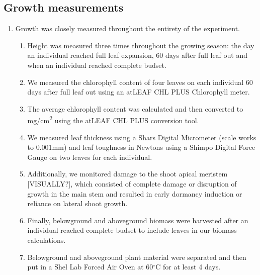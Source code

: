 \documentclass{article}\usepackage[]{graphicx}\usepackage[]{color}
\begin{document}
\subsection*{Growth measurements}
\begin{enumerate}
\item Growth was closely measured throughout the entirety of the experiment. 
  \begin{enumerate}
  \item Height was measured three times throughout the growing season: the day an individual reached full leaf expansion, 60 days after full leaf out and when an individual reached complete budset. 
  \item We measured the chlorophyll content of four leaves on each individual 60 days after full leaf out using an atLEAF CHL PLUS Chlorophyll meter.
  \item The average chlorophyll content was calculated and then converted to mg/cm\textsuperscript{2} using the atLEAF CHL PLUS conversion tool.
  \item We measured leaf thickness using a Shars Digital Micrometer (scale works to 0.001mm) and leaf toughness in Newtons using a Shimpo Digital Force Gauge on two leaves for each individual.
  \item Additionally, we monitored damage to the shoot apical meristem [VISUALLY?], which consisted of complete damage or disruption of growth in the main stem and resulted in early dormancy induction or reliance on lateral shoot growth.
  \item Finally, belowground and aboveground biomass were harvested after an individual reached complete budset to include leaves in our biomass calculations. 
  \item Belowground and aboveground plant material were separated and then put in a Shel Lab Forced Air Oven at 60$^{\circ}$C for at least 4 days. 
  \end{enumerate}
\end{enumerate}
\end{document}
